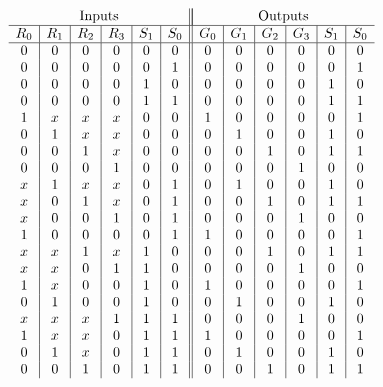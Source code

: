 \documentclass[12pt]{article}
\begin{document}
\[
        \begin{array}{c|c|c|c|c|c||c|c|c|c|c|c}
                \multicolumn{6}{c||}{\text{Inputs}} & \multicolumn{6}{|c}{\text{Outputs}}\\
                \hline
                R_0 & R_1 & R_2 & R_3 & S_1 & S_0 & G_0 & G_1 & G_2 & G_3 & S_1 & S_0 \\
                \hline
                0 & 0 & 0 & 0 & 0 & 0 & 0 & 0 & 0 & 0 & 0 & 0 \\
                0 & 0 & 0 & 0 & 0 & 1 & 0 & 0 & 0 & 0 & 0 & 1 \\
                0 & 0 & 0 & 0 & 1 & 0 & 0 & 0 & 0 & 0 & 1 & 0 \\
                0 & 0 & 0 & 0 & 1 & 1 & 0 & 0 & 0 & 0 & 1 & 1 \\
                1 & x & x & x & 0 & 0 & 1 & 0 & 0 & 0 & 0 & 1 \\
                0 & 1 & x & x & 0 & 0 & 0 & 1 & 0 & 0 & 1 & 0 \\
                0 & 0 & 1 & x & 0 & 0 & 0 & 0 & 1 & 0 & 1 & 1 \\
                0 & 0 & 0 & 1 & 0 & 0 & 0 & 0 & 0 & 1 & 0 & 0 \\
                x & 1 & x & x & 0 & 1 & 0 & 1 & 0 & 0 & 1 & 0 \\
                x & 0 & 1 & x & 0 & 1 & 0 & 0 & 1 & 0 & 1 & 1 \\
                x & 0 & 0 & 1 & 0 & 1 & 0 & 0 & 0 & 1 & 0 & 0 \\
                1 & 0 & 0 & 0 & 0 & 1 & 1 & 0 & 0 & 0 & 0 & 1 \\
                x & x & 1 & x & 1 & 0 & 0 & 0 & 1 & 0 & 1 & 1 \\
                x & x & 0 & 1 & 1 & 0 & 0 & 0 & 0 & 1 & 0 & 0 \\
                1 & x & 0 & 0 & 1 & 0 & 1 & 0 & 0 & 0 & 0 & 1 \\
                0 & 1 & 0 & 0 & 1 & 0 & 0 & 1 & 0 & 0 & 1 & 0 \\
                x & x & x & 1 & 1 & 1 & 0 & 0 & 0 & 1 & 0 & 0 \\
                1 & x & x & 0 & 1 & 1 & 1 & 0 & 0 & 0 & 0 & 1 \\
                0 & 1 & x & 0 & 1 & 1 & 0 & 1 & 0 & 0 & 1 & 0 \\
                0 & 0 & 1 & 0 & 1 & 1 & 0 & 0 & 1 & 0 & 1 & 1
        \end{array}
\]

\pagebreak
\end{document}
